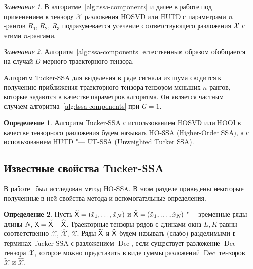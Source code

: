 \documentclass[specialist,
  substylefile = spbu.rtx,
subf,href,colorlinks=true, 12pt]{disser}
\theoremstyle{plain}
\theoremstyle{definition}
\newtheorem{definition}{Определение}[section]
\theoremstyle{remark}
\newtheorem{remark}{Замечание}[section]
\def\newdecomp/{HUTD}
\def\tssa/{Tucker-SSA}
\def\newtssa/{UT-SSA}
\def\newtssafull/{Unweighted Tucker SSA}
\begin{document}
\begin{remark}
  В алгоритме~\ref{alg:tssa-components} и далее в работе под
  применением к тензору $\mathcal{X}$ разложения HOSVD или \newdecomp/ с параметрами
  $n$-рангов $R_1,\, R_2,\, R_3$ подразумевается усечение
  соответствующего разложения $\mathcal{X}$ с этими $n$-рангами.
\end{remark}

\begin{remark}
  Алгоритм~\ref{alg:tssa-components}
  естественным образом обобщается на случай $D$-мерного
  траекторного тензора.
\end{remark}

Алгоритм \tssa/ для выделения в ряде сигнала из шума сводится к получению
приближения траекторного тензора тензором меньших $n$-рангов,
которые задаются в качестве параметров алгоритма.
Он является частным случаем алгоритма~\ref{alg:tssa-components} при $G=1$.

\begin{definition}
  Алгоритм \tssa/ с использованием HOSVD или HOOI в качестве
  тензорного разложения будем называть HO-SSA (Higher-Order SSA), а с
  использованием \newdecomp/ "--- \newtssa/ (\newtssafull/).
\end{definition}

\subsection{Известные свойства \tssa/}
В работе~\cite{Thesis2024} был исследован метод HO-SSA.
В этом разделе приведены некоторые полученные в ней свойства
метода и вспомогательные определения.

\begin{definition}
  Пусть $\widetilde{\mathsf{X}}=(\tilde{x}_1,\ldots , \tilde{x}_N)$ и
  $\widehat{\mathsf{X}}=(\hat{x}_1,\ldots , \hat{x}_N)$ "--- временные
  ряды длины $N$,
  $\mathsf{X} = \widetilde{\mathsf{X}} + \widehat{\mathsf{X}}$.
  Траекторные тензоры рядов с длинами окна $L, K$ равны
  соответственно $\widetilde{\mathcal{X}},\,
  \widehat{\mathcal{X}},\, \mathcal{X}$.
  Ряды $\widetilde{\mathsf{X}}$ и $\widehat{\mathsf{X}}$ будем называть (слабо)
  разделимыми в терминах \tssa/ с разложением
  $\operatorname{Dec}$, если существует разложение $\operatorname{Dec}$ тензора
  $\mathcal{X}$, которое можно представить
  в виде суммы разложений $\operatorname{Dec}$ тензоров
  $\widetilde{\mathcal{X}}$ и $\widehat{\mathcal{X}}$.
\end{definition}
\end{document}
